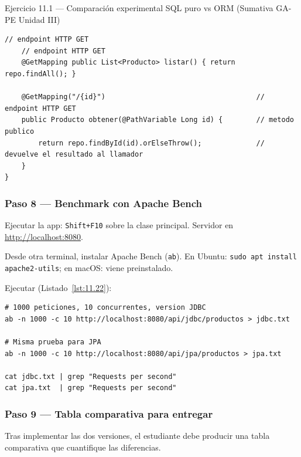 \documentclass[11pt,a4paper,openany]{book}
\begin{document}
\begin{cajaejercicio}{Ejercicio 11.1 --- Comparación experimental SQL puro vs ORM (Sumativa GA-PE Unidad III)}
\begin{lstlisting}[style=java,caption={ProductoRepository.java + JpaController.java},label=lst:11.21]
    // endpoint HTTP GET
    // endpoint HTTP GET
    @GetMapping public List<Producto> listar() { return repo.findAll(); }

    @GetMapping("/{id}")                                    // endpoint HTTP GET
    public Producto obtener(@PathVariable Long id) {        // metodo publico
        return repo.findById(id).orElseThrow();             // devuelve el resultado al llamador
    }
}
\end{lstlisting}

\subsubsection*{Paso 8 --- Benchmark con Apache Bench}

Ejecutar la app: \texttt{Shift+F10} sobre la clase principal. Servidor
en \url{http://localhost:8080}.

Desde otra terminal, instalar Apache Bench (\texttt{ab}). En Ubuntu:
\texttt{sudo apt install apache2-utils}; en macOS: viene preinstalado.

Ejecutar (Listado~\ref{lst:11.22}):
\begin{lstlisting}[style=shell,numbers=none,caption={Ejemplo de Shell},label=lst:11.22]
# 1000 peticiones, 10 concurrentes, version JDBC
ab -n 1000 -c 10 http://localhost:8080/api/jdbc/productos > jdbc.txt

# Misma prueba para JPA
ab -n 1000 -c 10 http://localhost:8080/api/jpa/productos > jpa.txt

cat jdbc.txt | grep "Requests per second"
cat jpa.txt  | grep "Requests per second"
\end{lstlisting}

\subsubsection*{Paso 9 --- Tabla comparativa para entregar}

Tras implementar las dos versiones, el estudiante debe
producir una tabla comparativa que cuantifique las diferencias.



\end{cajaejercicio}
\end{document}
